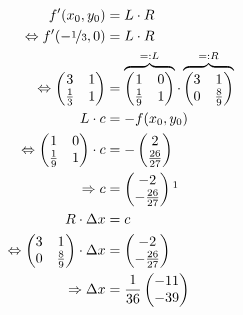\begin{align}
%
	f'(x_0,y_0)	&= L \cdot R \\
	\Leftrightarrow f'(-\nicefrac{1}{3}, 0)	&= L \cdot R \\
	\Leftrightarrow \begin{pmatrix}
		3     & 1\\
		\frac{1}{3} & 1
	\end{pmatrix}
	&=
	\overbrace{\begin{pmatrix}
		1      & 0\\
		\frac{1}{9} & 1
	\end{pmatrix}}^{=: L} \cdot 
	\overbrace{\begin{pmatrix}
		3 & 1\\
		0      & \frac{8}{9}
	\end{pmatrix}}^{=: R}\\
%
	L \cdot c	&= -f(x_0,y_0) \\
	\Leftrightarrow
	\begin{pmatrix}
		1      & 0\\
		\frac{1}{9} & 1
	\end{pmatrix}
	\cdot c
	&= -
		\begin{pmatrix}
		2\\
		\frac{26}{27}
	\end{pmatrix}\\
	\Rightarrow
	c &=		\begin{pmatrix}
		-2\\
		-\frac{26}{27}
	\end{pmatrix}\footnotemark\\
%
	R\cdot \Delta x &= c\\
	\Leftrightarrow
	\begin{pmatrix}
		3 & 1\\
		0      & \frac{8}{9}
	\end{pmatrix}
	\cdot \Delta x &=
	\begin{pmatrix}
		-2\\
		-\frac{26}{27}
	\end{pmatrix}\\
	\Rightarrow \Delta x &= \frac{1}{36}
	\begin{pmatrix}
		-11\\
		-39
	\end{pmatrix}
\end{align}

